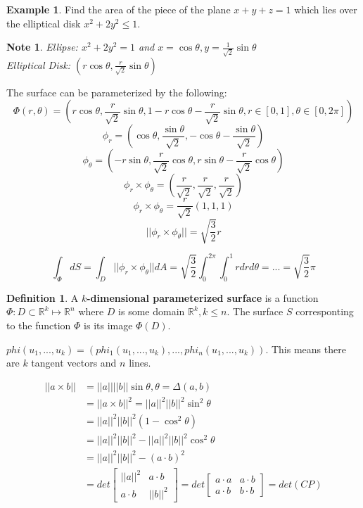 \documentclass[12pt]{article}
\theoremstyle{plain}
\newtheorem*{note}{Note}
\theoremstyle{definition}
\newtheorem{definition}[theorem]{Definition}
\newtheorem{example}[theorem]{Example}
\begin{document}
\begin{example}
	Find the area of the piece of the plane $x+y+z=1$ which lies over the elliptical disk $x^2 + 2y^2 \leq 1$.\\
	\begin{note}
		Ellipse: $x^2 + 2y^2 = 1$ and $x=\cos\theta, y=\frac{1}{\sqrt{2}} \sin\theta$\\
		Elliptical Disk: $(r\cos\theta, \frac{r}{\sqrt{2}} \sin\theta)$
	\end{note}
	The surface can be parameterized by the following:
	$$\Phi (r,\theta) = (r\cos\theta, \frac{r}{\sqrt{2}} \sin\theta, 1-r\cos\theta-\frac{r}{\sqrt{2}} \sin\theta, r \in [0,1], \theta \in [0,2\pi])$$
	$$\phi_r = (\cos\theta, \frac{\sin\theta}{\sqrt{2}}, -\cos\theta - \frac{\sin\theta}{\sqrt{2}})$$
	$$\phi_\theta = (-r\sin\theta, \frac{r}{\sqrt{2}} \cos\theta, r\sin\theta - \frac{r}{\sqrt{2}} \cos\theta)$$
	$$\phi_r \times \phi_\theta = (\frac{r}{\sqrt{2}},\frac{r}{\sqrt{2}},\frac{r}{\sqrt{2}})$$
	$$\phi_r \times \phi_\theta = \frac{r}{\sqrt{2}} (1,1,1)$$
	$$||\phi_r \times \phi_\theta|| = \sqrt{\frac{3}{2}} r$$

	$$\int_\Phi dS = \int_D ||\phi_r \times \phi_\theta|| dA = \sqrt{\frac{3}{2}} \int^{2\pi}_0 \int^1_0 rdrd\theta = ... = \sqrt{\frac{3}{2}} \pi$$
\end{example}

\begin{definition}
 A \textbf{$k$-dimensional parameterized surface} is a function $\Phi: D \subset \mathbb{R}^k \mapsto \mathbb{R}^n$ where $D$ is some domain $\mathbb{R}^k, k\leq n$. The surface $S$ corresponting to the function $\Phi$ is its image $\Phi (D)$.
\end{definition}

$phi (u_1, ..., u_k) = (phi_1 (u_1, ..., u_k), ..., phi_n (u_1, ..., u_k))$. This means there are $k$ tangent vectors and $n$ lines.

\begin{align*}
	||a \times b|| &= ||a||||b||\sin\theta, \theta = \Delta (a,b)\\
	&= ||a \times b||^2 = ||a||^2||b||^2\sin^2\theta\\
	&= ||a||^2||b||^2 (1-\cos^2 \theta)\\
	&= ||a||^2||b||^2 - ||a||^2||b||^2\cos^2 \theta\\
	&= ||a||^2||b||^2 - (a\cdot b)^2\\
	&= det\begin{bmatrix}
||a||^2 & a\cdot b \\
a\cdot b & ||b||^2
\end{bmatrix} =
det\begin{bmatrix}
a\cdot a & a\cdot b \\
a\cdot b & b\cdot b
\end{bmatrix} = det(CP)
\end{align*}
\end{document}
